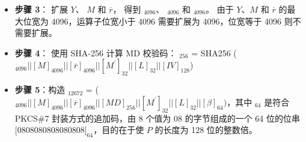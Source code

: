 \documentclass[main\_\_CN.tex]{subfiles}
\begin{document}
\begin{itemize}
    \item \label{Expand big number} {\bfseries 步骤 3}：
          扩展 \begin{math}Y\end{math}、
               \begin{math}M\end{math} 和
               \begin{math}\overline{r}\end{math}，
          得到 \begin{math}[Y]_{4096}\end{math}、
               \begin{math}[M]_{4096}\end{math} 和
               \begin{math}[\overline{r}]_{4096}\end{math}。
          由于 \begin{math}Y\end{math}、\begin{math}M\end{math} 和 \begin{math}\overline{r}\end{math} 的最大位宽为 4096，运算子位宽小于 4096 需要扩展为 4096，位宽等于 4096 则不需要扩展。


    \item \label{Extract MD} {\bfseries 步骤 4}：
            使用 SHA-256 计算 MD 校验码：
                \begin{math}[MD]_{256}\end{math} = SHA256 (
            \begin{math}
                [Y]_{4096} ||
                [M]_{4096} ||
                [\overline{r}]_{4096} ||
                [M^{\prime}]_{32} ||
                [L]_{32} ||
                [IV]_{128}
            \end{math})

    \item {\bfseries 步骤 5}\label{Build Plaintext}：构造 \begin{math}[P]_{12672}\end{math} = (
            \begin{math}
                [Y]_{4096} ||
                [M]_{4096} ||
                [\overline{r}]_{4096} ||
                [MD]_{256} ||
                [M^{\prime}]_{32} ||
                [L]_{32} ||
                [\beta]_{64})
            \end{math}，其中 \begin{math}[\beta]_{64} \end{math} 是符合 PKCS\#7 封装方式的追加码，由 8 个值为 \hexprefix{}08 的字节组成的一个 64 位的位串 $[$\hexprefix{}0808080808080808$]_{64}$，目的在于使 \begin{math}P\end{math} 的长度为 128 位的整数倍。


\end{itemize}
\end{document}
